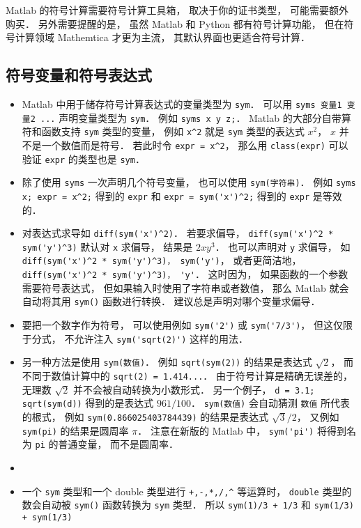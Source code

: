 

Matlab 的符号计算需要符号计算工具箱， 取决于你的证书类型， 可能需要额外购买． 另外需要提醒的是， 虽然 Matlab 和 Python 都有符号计算功能， 但在符号计算领域 Mathemtica 才更为主流， 其默认界面也更适合符号计算．

\subsection{符号变量和符号表达式}
\begin{itemize}
\item Matlab 中用于储存符号计算表达式的变量类型为 \verb|sym|． 可以用 \verb|syms 变量1 变量2 ...| 声明变量类型为 \verb|sym|． 例如 \verb|syms x y z;|． Matlab 的大部分自带算符和函数支持 \verb|sym| 类型的变量， 例如 \verb|x^2| 就是 \verb|sym| 类型的表达式 $x^2$， $x$ 并不是一个数值而是符号． 若此时令 \verb|expr = x^2|， 那么用 \verb|class(expr)| 可以验证 \verb|expr| 的类型也是 \verb|sym|．

\item 除了使用 \verb|syms| 一次声明几个符号变量， 也可以使用 \verb|sym(字符串)|． 例如 \verb|syms x; expr = x^2;| 得到的 \verb|expr| 和 \verb|expr = sym('x')^2;| 得到的 \verb|expr| 是等效的．

\item  对表达式求导如 \verb|diff(sym('x')^2)|． 若要求偏导， \verb|diff(sym('x')^2 * sym('y')^3)| 默认对 \verb|x| 求偏导， 结果是 $2x y^3$． 也可以声明对 \verb|y| 求偏导， 如 \verb|diff(sym('x')^2 * sym('y')^3)， sym('y')|， 或者更简洁地， \verb|diff(sym('x')^2 * sym('y')^3)， 'y'|． 这时因为， 如果函数的一个参数需要符号表达式， 但如果输入时使用了字符串或者数值， 那么 Matlab 就会自动将其用 \verb|sym()| 函数进行转换． 建议总是声明对哪个变量求偏导．

\item  要把一个数字作为符号， 可以使用例如 \verb|sym('2')| 或 \verb|sym('7/3')|， 但这仅限于分式， 不允许注入 \verb|sym('sqrt(2)')| 这样的用法．

\item 另一种方法是使用 \verb|sym(数值)|． 例如 \verb|sqrt(sym(2))| 的结果是表达式 $\sqrt 2$， 而不同于数值计算中的 \verb|sqrt(2) = 1.414...|． 由于符号计算是精确无误差的， 无理数 $\sqrt{2}$ 并不会被自动转换为小数形式． 另一个例子， \verb|d = 3.1; sqrt(sym(d))| 得到的是表达式 $961/100$． \verb|sym(数值)| 会自动猜测 \verb|数值| 所代表的根式， 例如 \verb|sym(0.866025403784439)| 的结果是表达式 $\sqrt{3}/2$， 又例如 \verb|sym(pi)| 的结果是圆周率 $\pi$． 注意在新版的 Matlab 中， \verb|sym('pi')| 将得到名为 \verb|pi| 的普通变量， 而不是圆周率．

\item \item 一个 \verb|sym| 类型和一个 double 类型进行 \verb|+,-,*,/,^| 等运算时， \verb|double| 类型的数会自动被 \verb|sym()| 函数转换为 \verb|sym| 类型． 所以 \verb|sym(1)/3 + 1/3| 和 \verb|sym(1/3) + sym(1/3)|
\end{itemize}

